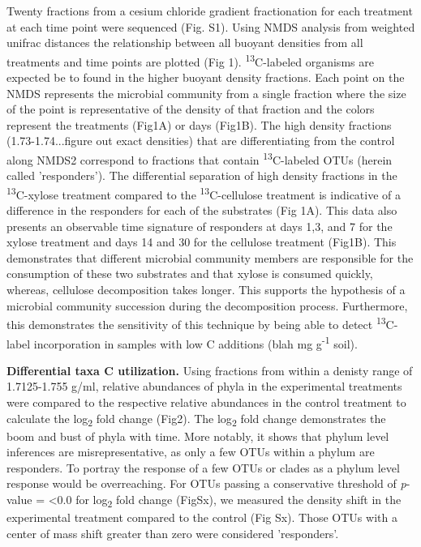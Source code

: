 Twenty fractions from a cesium chloride gradient fractionation for each treatment at each time point were sequenced (Fig. S1). Using NMDS analysis from weighted unifrac distances the relationship between all buoyant densities from all treatments and time points are plotted (Fig 1). \textsuperscript{13}C-labeled organisms are expected be to found in the higher buoyant density fractions. Each point on the NMDS represents the microbial community from a single fraction where the size of the point is representative of the density of that fraction and the colors represent the treatments (Fig1A) or days (Fig1B). The high density fractions (1.73-1.74...figure out exact densities) that are differentiating from the control along NMDS2 correspond to fractions that contain \textsuperscript{13}C-labeled OTUs (herein called 'responders'). The differential separation of high density fractions in the \textsuperscript{13}C-xylose treatment compared to the \textsuperscript{13}C-cellulose treatment is indicative of a difference in the responders for each of the substrates (Fig 1A). This data also presents an observable time signature of responders at days 1,3, and 7 for the xylose treatment and days 14 and 30 for the cellulose treatment (Fig1B). This demonstrates that different microbial community members are responsible for the consumption of these two substrates and that xylose is consumed quickly, whereas, cellulose decomposition takes longer. This supports the hypothesis of a microbial community succession during the decomposition process. Furthermore, this demonstrates the sensitivity of this technique by being able to detect \textsuperscript{13}C-label incorporation in samples with low C additions (blah mg g\textsuperscript{-1} soil).    


\textbf{Differential taxa C utilization.} Using fractions from within a denisty range of 1.7125-1.755 g/ml, relative abundances of phyla in the experimental treatments were compared to the respective relative abundances in the control treatment to calculate the log\textsubscript{2} fold change (Fig2). The log\textsubscript{2} fold change demonstrates the boom and bust of phyla with time.  More notably, it shows that phylum level inferences are misrepresentative, as only a few OTUs within a phylum are responders. To portray the response of a few OTUs or clades as a phylum level response would be overreaching. For OTUs passing a conservative threshold of \textit{p}-value = <0.0 for log\textsubscript{2} fold change (FigSx), we measured the density shift in the experimental treatment compared to the control (Fig Sx).  Those OTUs with a center of mass shift greater than zero were considered 'responders'.   

